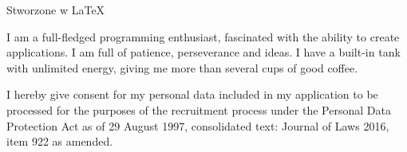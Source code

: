 \documentclass[a4paper]{article}
\begin{document}
    
    \noindent\hspace{9.7cm} Stworzone w LaTeX
    
    I am a full-fledged programming enthusiast, fascinated with the ability to create applications. I am full of patience, perseverance and ideas. I have a built-in tank with unlimited energy, giving me more than several cups of good coffee.%
    
    \noindent\makebox[\linewidth]{\rule{\paperwidth}{0.4pt}}
        
    \leftPanel
        
    \rightPanel
    I hereby give consent for my personal data included in my application to be processed for the purposes of the recruitment process under the Personal Data Protection Act as of 29 August 1997, consolidated text: Journal of Laws 2016, item 922 as amended.%
\end{document}
